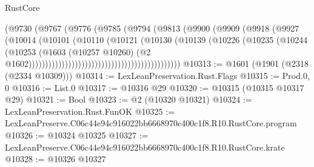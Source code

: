 \begin{lexlean}{RustCore}
\begin{coremodule}
                                                    (@9730
                                                      (@9767
                                                        (@9776
                                                          (@9785
                                                            (@9794
                                                              (@9813
                                                                (@9900
                                                                  (@9909
                                                                    (@9918
                                                                      (@9927
                                                                        (@10014
                                                                          (@10101
                                                                            (@10110
                                                                              (@10121
                                                                                (@10130
                                                                                  (@10139
                                                                                    (@10226
                                                                                      (@10235
                                                                                        (@10244
                                                                                          (@10253
                                                                                            (@1603
                                                                                              (@10257
                                                                                                @10260)
                                                                                              (@2
                                                                                                @1602))))))))))))))))))))))))))))))))))))))))))))))
@10313 := @1601 (@1901 (@2318 (@2334 @10309)))
@10314 := LexLeanPreservation.Rust.Flags
@10315 := Prod.{0, 0}
@10316 := List.{0}
@10317 := @10316 @29
@10320 := @10315 (@10315 @10317 @29)
@10321 := Bool
@10323 := @2 (@10320 @10321)
@10324 := LexLeanPreservation.Rust.FunOK
@10325 := LexLeanPreserve.C06c44e94c916022bb6668970c400c1f8.R10.RustCore.program
@10326 := @10324 @10325
@10327 := LexLeanPreserve.C06c44e94c916022bb6668970c400c1f8.R10.RustCore.krate
@10328 := @10326 @10327

\end{coremodule}
\end{lexlean}
